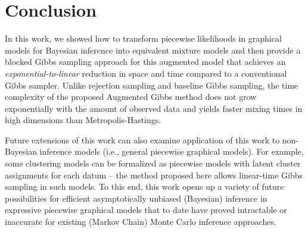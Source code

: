 \section{Conclusion}
\label{sect:conclusion}

In this work, we showed how to transform piecewise likelihoods in
graphical models for Bayesian inference into equivalent mixture models
and then provide a blocked Gibbs sampling approach for this augmented
model that achieves an \emph{exponential-to-linear} reduction in space
and time compared to a conventional Gibbs sampler.  Unlike rejection
sampling and baseline Gibbs sampling, the time complexity of the
proposed Augmented Gibbs method does not grow exponentially with the
amount of observed data and yields faster mixing times in high
dimensions than Metropolis-Hastings.

Future extensions of this work can also examine application of this
work to non-Bayesian inference models (i.e., general piecewise
graphical models).  For example, some clustering models can be
formalized as piecewise models with latent cluster assignments for
each datum -- the method proposed here allows linear-time Gibbs
sampling in such models.  To this end, this work opens up a variety of
future possibilities for efficient asymptotically unbiased (Bayesian)
inference in expressive piecewise graphical models that to date have
proved intractable or inaccurate for existing (Markov Chain) Monte
Carlo inference approaches.

